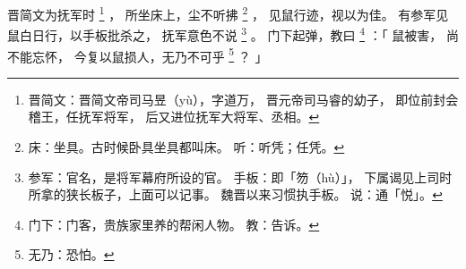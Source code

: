
\switchcolumn*[\section{}]

晋简文为抚军时%
\footnote{%
    晋简文：晋简文帝司马昱（yù），字道万，
            晋元帝司马睿的幼子，
            即位前封会稽王，任抚军将军，
            后又进位抚军大将军、丞相。
}%
，
所坐床上，尘不听拂%
\footnote{%
    床：坐具。古时候卧具坐具都叫床。
    听：听凭；任凭。
}%
，
见鼠行迹，视以为佳。
有参军见鼠白日行，以手板批杀之，
抚军意色不说%
\footnote{%
    参军：官名，是将军幕府所设的官。
    手板：即「笏（hù）」，
          下属谒见上司时所拿的狭长板子，上面可以记事。
          魏晋以来习惯执手板。
    说：通「悦」。
}%
。
门下起弹，教曰%
\footnote{%
    门下：门客，贵族家里养的帮闲人物。
    教：告诉。
}%
：「
    鼠被害，
    尚不能忘怀，
    今复以鼠损人，无乃不可乎%
    \footnote{%
        无乃：恐怕。
    }%
    ？
」

\switchcolumn



